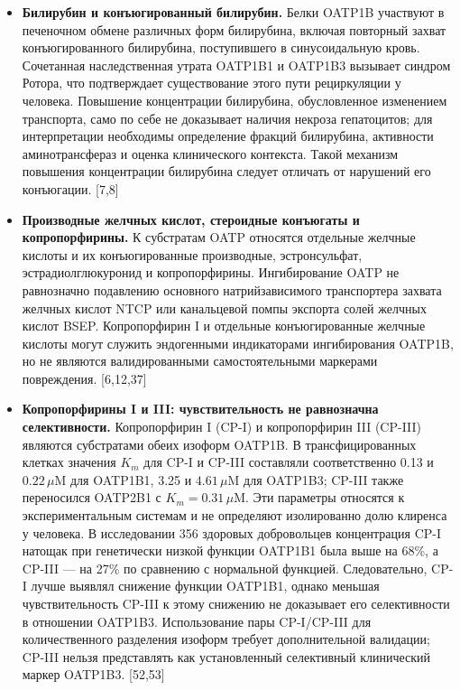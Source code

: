 \documentclass[11pt]{article}
\begin{document}
\begin{itemize}
\item \textbf{Билирубин и конъюгированный билирубин.} Белки OATP1B участвуют в печеночном обмене различных форм билирубина, включая повторный захват конъюгированного билирубина, поступившего в синусоидальную кровь. Сочетанная наследственная утрата OATP1B1 и OATP1B3 вызывает синдром Ротора, что подтверждает существование этого пути рециркуляции у человека. Повышение концентрации билирубина, обусловленное изменением транспорта, само по себе не доказывает наличия некроза гепатоцитов; для интерпретации необходимы определение фракций билирубина, активности аминотрансфераз и оценка клинического контекста. Такой механизм повышения концентрации билирубина следует отличать от нарушений его конъюгации. [7,8]
\item \textbf{Производные желчных кислот, стероидные конъюгаты и копропорфирины.} К субстратам OATP относятся отдельные желчные кислоты и их конъюгированные производные, эстронсульфат, эстрадиолглюкуронид и копропорфирины. Ингибирование OATP не равнозначно подавлению основного натрийзависимого транспортера захвата желчных кислот NTCP или канальцевой помпы экспорта солей желчных кислот BSEP. Копропорфирин I и отдельные конъюгированные желчные кислоты могут служить эндогенными индикаторами ингибирования OATP1B, но не являются валидированными самостоятельными маркерами повреждения. [6,12,37]
\item \textbf{Копропорфирины I и III: чувствительность не равнозначна селективности.} Копропорфирин I (CP-I) и копропорфирин III (CP-III) являются субстратами обеих изоформ OATP1B. В трансфицированных клетках значения \(K_m\) для CP-I и CP-III составляли соответственно 0.13 и \(0.22\,\mu\mathrm{M}\) для OATP1B1, 3.25 и \(4.61\,\mu\mathrm{M}\) для OATP1B3; CP-III также переносился OATP2B1 с \(K_m=0.31\,\mu\mathrm{M}\). Эти параметры относятся к экспериментальным системам и не определяют изолированно долю клиренса у человека. В исследовании 356 здоровых добровольцев концентрация CP-I натощак при генетически низкой функции OATP1B1 была выше на 68\%, а CP-III --- на 27\% по сравнению с нормальной функцией. Следовательно, CP-I лучше выявлял снижение функции OATP1B1, однако меньшая чувствительность CP-III к этому снижению не доказывает его селективности в отношении OATP1B3. Использование пары CP-I/CP-III для количественного разделения изоформ требует дополнительной валидации; CP-III нельзя представлять как установленный селективный клинический маркер OATP1B3. [52,53]


\end{itemize}
\end{document}
